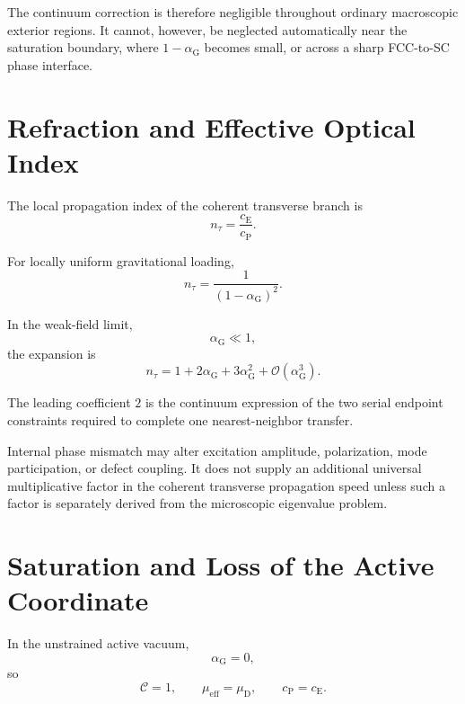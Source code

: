 The continuum correction is therefore negligible throughout ordinary macroscopic exterior regions. It cannot, however, be neglected automatically near the saturation boundary, where $1-\alpha_{\mathrm{G}}$ becomes small, or across a sharp FCC-to-SC phase interface.

\section{Refraction and Effective Optical Index}
\label{sec:grav_refraction_appendix}

The local propagation index of the coherent transverse branch is
\begin{equation}
    n_{\tau} = \frac{c_{\mathrm{E}}}{c_{\mathrm{P}}}.
\end{equation}

For locally uniform gravitational loading,
\begin{equation}
    n_{\tau} = \frac{1}{ \left( 1-\alpha_{\mathrm{G}} \right)^2 }.
    \label{eq:gravity_refraction_index_appendix}
\end{equation}

In the weak-field limit,
\begin{equation}
    \alpha_{\mathrm{G}} \ll 1,
\end{equation}
the expansion is
\begin{equation}
    n_{\tau} = 1 + 2\alpha_{\mathrm{G}} + 3\alpha_{\mathrm{G}}^2 + \mathcal{O} \left( \alpha_{\mathrm{G}}^3 \right).
    \label{eq:gravity_index_expansion_appendix}
\end{equation}

The leading coefficient $2$ is the continuum expression of the two serial endpoint constraints required to complete one nearest-neighbor transfer.

Internal phase mismatch may alter excitation amplitude, polarization, mode participation, or defect coupling. It does not supply an additional universal multiplicative factor in the coherent transverse propagation speed unless such a factor is separately derived from the microscopic eigenvalue problem.

\section{Saturation and Loss of the Active Coordinate}
\label{sec:grav_saturation_appendix}

In the unstrained active vacuum,
\begin{equation}
    \alpha_{\mathrm{G}} = 0,
\end{equation}
so
\begin{equation}
    \mathcal{C} = 1, \qquad \mu_{\mathrm{eff}} = \mu_{\mathrm{D}}, \qquad c_{\mathrm{P}} = c_{\mathrm{E}}.
\end{equation}

